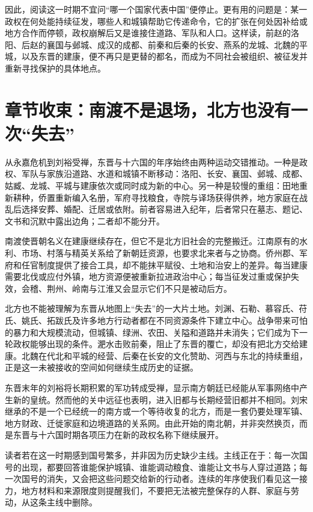 因此，阅读这一时期不宜问“哪一个国家代表中国”便停止。更有用的问题是：某一政权在何处能持续征发，哪些人和城镇帮助它传递命令，它的扩张在何处因补给或地方合作而停顿，政权崩解后又是谁接住道路、军队和人口。这样读，前赵的洛阳、后赵的襄国与邺城、成汉的成都、前秦和后秦的长安、燕系的龙城、北魏的平城，以及东晋的建康，便不再只是更替的都名，而成为不同社会被组织、被征发并重新寻找保护的具体地点。

\section{章节收束：南渡不是退场，北方也没有一次“失去”}
\label{sec:eastern-jin-depth-conclusion}

从永嘉危机到刘裕受禅，东晋与十六国的年序始终由两种运动交错推动。一种是政权、军队与家族沿道路、水道和城镇不断移动：洛阳、长安、襄国、邺城、成都、姑臧、龙城、平城与建康依次或同时成为新的中心。另一种是较慢的重组：田地重新耕种，侨置重新编入名册，军府寻找粮食，寺院与译场获得供养，地方家庭在战乱后选择安葬、婚配、迁居或依附。前者容易进入纪年，后者常只在墓志、题记、文书和沉默中露出边角；二者却不能分开。

南渡使晋朝名义在建康继续存在，但它不是北方旧社会的完整搬迁。江南原有的水利、市场、村落与精英关系给了新朝廷资源，也要求北来者与之协商。侨州郡、军府和任官制度提供了接合工具，却不能抹平赋役、土地和治安上的差异。每当建康需要北伐或应付外镇，地方资源便被重新拉进政治中心；每当征发过重或保护失效，会稽、荆州、岭南与江淮又会显示它们不只是被动后方。

北方也不能被理解为东晋从地图上“失去”的一大片土地。刘渊、石勒、慕容氏、苻氏、姚氏、拓跋氏及许多地方行动者都在不同资源条件下建立中心。战争带来可怕的暴力和大规模流动，但城镇、绿洲、农田、关隘和道路并未消失；它们成为下一轮政权能够出现的条件。淝水击败前秦，阻止了东晋的覆亡，却没有把北方交给建康。北魏在代北和平城的经营、后秦在长安的文化赞助、河西与东北的持续重组，正是这一未被接收的空间如何继续生成历史的证据。

东晋末年的刘裕将长期积累的军功转成受禅，显示南方朝廷已经能从军事网络中产生新的皇统。然而他的关中远征也表明，进入旧都与长期经营旧都并不相同。刘宋继承的不是一个已经统一的南方或一个等待收复的北方，而是一套仍要处理军镇、地方财政、迁徙家庭和边境道路的关系网。由此开始的南北朝，并非突然换页，而是东晋与十六国时期各项压力在新的政权名称下继续展开。

读者若在这一时期感到国号繁多，并非因为历史缺少主线。主线正在于：每一次国号的出现，都要回答谁能保护城镇、谁能调动粮食、谁能让文书与人穿过道路；每一次国号的消失，又会把这些问题交给新的行动者。连续的年序使我们看见这一接力，地方材料和来源限度则提醒我们，不要把无法被完整保存的人群、家庭与劳动，从这条主线中删除。

